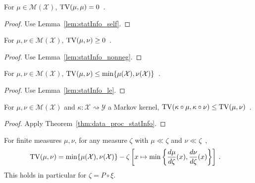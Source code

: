 \begin{lemma}
  \label{lem:tv_self}
  For $\mu \in \mathcal M(\mathcal X)$, $\operatorname{TV}(\mu, \mu) = 0$~.
\end{lemma}

\begin{proof}%
{}
Use Lemma~\ref{lem:statInfo_self}.
\end{proof}

\begin{lemma}
  \label{lem:tv_nonneg}
  For $\mu, \nu \in \mathcal M(\mathcal X)$, $\operatorname{TV}(\mu, \nu) \ge 0$~.
\end{lemma}

\begin{proof}%
{}
Use Lemma~\ref{lem:statInfo_nonneg}.
\end{proof}


\begin{lemma}
  \label{lem:tv_le}
  For $\mu, \nu \in \mathcal M(\mathcal X)$, $\operatorname{TV}(\mu, \nu) \le \min\{\mu(\mathcal X), \nu(\mathcal X)\}$~.
\end{lemma}

\begin{proof}%
{}
Use Lemma~\ref{lem:statInfo_le}.
\end{proof}


\begin{theorem}
  \label{thm:tv_data_proc}
  For $\mu, \nu \in \mathcal M(\mathcal X)$ and $\kappa : \mathcal X \rightsquigarrow \mathcal Y$ a Markov kernel, $\operatorname{TV}(\kappa \circ \mu, \kappa \circ \nu) \le \operatorname{TV}(\mu, \nu)$~.
\end{theorem}

\begin{proof}%
{}
Apply Theorem~\ref{thm:data_proc_statInfo}.
\end{proof}


\begin{lemma}
  \label{lem:tv_eq_sub_min}
  For finite measures $\mu, \nu$, for any measure $\zeta$ with $\mu \ll \zeta$ and $\nu \ll \zeta$~,
  \begin{align*}
  \operatorname{TV}(\mu, \nu)
  &= \min\{\mu(\mathcal X), \nu(\mathcal X)\} - \zeta\left[x \mapsto \min \left\{\frac{d \mu}{d\zeta}(x), \frac{d \nu}{d\zeta}(x)\right\}\right]
  \: .
  \end{align*}
  This holds in particular for $\zeta = P \circ \xi$.
\end{lemma}

